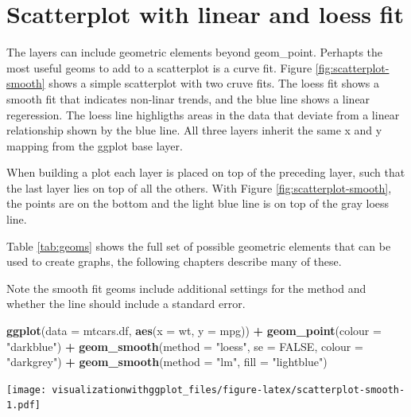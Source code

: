 \documentclass[]{krantz}
\makeatletter
\newenvironment{Shaded}{\begin{snugshade}}{\end{snugshade}}
\newcommand{\KeywordTok}[1]{\textcolor[rgb]{0.13,0.29,0.53}{\textbf{#1}}}
\newcommand{\DataTypeTok}[1]{\textcolor[rgb]{0.13,0.29,0.53}{#1}}
\newcommand{\StringTok}[1]{\textcolor[rgb]{0.31,0.60,0.02}{#1}}
\newcommand{\OtherTok}[1]{\textcolor[rgb]{0.56,0.35,0.01}{#1}}
\newcommand{\OperatorTok}[1]{\textcolor[rgb]{0.81,0.36,0.00}{\textbf{#1}}}
\newcommand{\NormalTok}[1]{#1}
\newenvironment{kframe}{%
\medskip{}
\setlength{\fboxsep}{.8em}
 \def\at@end@of@kframe{}%
 \ifinner\ifhmode%
  \def\at@end@of@kframe{\end{minipage}}%
  \begin{minipage}{\columnwidth}%
 \fi\fi%
 \def\FrameCommand##1{\hskip\@totalleftmargin \hskip-\fboxsep
 \colorbox{shadecolor}{##1}\hskip-\fboxsep
     \hskip-\linewidth \hskip-\@totalleftmargin \hskip\columnwidth}%
 \MakeFramed {\advance\hsize-\width
   \@totalleftmargin\z@ \linewidth\hsize
   \@setminipage}}%
 {\par\unskip\endMakeFramed%
 \at@end@of@kframe}
\renewenvironment{Shaded}{\begin{kframe}}{\end{kframe}}
\theoremstyle{definition}
\theoremstyle{definition}
\theoremstyle{definition}
\theoremstyle{remark}
\makeatother
\begin{document}
\section{Scatterplot with linear and loess
fit}\label{scatterplot-with-linear-and-loess-fit}

The layers can include geometric elements beyond geom\_point. Perhapts
the most useful geoms to add to a scatterplot is a curve fit. Figure
\ref{fig:scatterplot-smooth} shows a simple scatterplot with two cruve
fits. The loess fit shows a smooth fit that indicates non-linar trends,
and the blue line shows a linear regeression. The loess line highligths
areas in the data that deviate from a linear relationship shown by the
blue line. All three layers inherit the same x and y mapping from the
ggplot base layer.

When building a plot each layer is placed on top of the preceding layer,
such that the last layer lies on top of all the others. With Figure
\ref{fig:scatterplot-smooth}, the points are on the bottom and the light
blue line is on top of the gray loess line.

Table \ref{tab:geoms} shows the full set of possible geometric elements
that can be used to create graphs, the following chapters describe many
of these.

Note the smooth fit geoms include additional settings for the method and
whether the line should include a standard error.

\begin{Shaded}
\begin{Highlighting}[]
\KeywordTok{ggplot}\NormalTok{(}\DataTypeTok{data =}\NormalTok{ mtcars.df, }\KeywordTok{aes}\NormalTok{(}\DataTypeTok{x =}\NormalTok{ wt, }\DataTypeTok{y =}\NormalTok{ mpg)) }\OperatorTok{+}
\StringTok{  }\KeywordTok{geom_point}\NormalTok{(}\DataTypeTok{colour =} \StringTok{"darkblue"}\NormalTok{) }\OperatorTok{+}
\StringTok{  }\KeywordTok{geom_smooth}\NormalTok{(}\DataTypeTok{method =} \StringTok{"loess"}\NormalTok{, }\DataTypeTok{se =} \OtherTok{FALSE}\NormalTok{, }\DataTypeTok{colour =} \StringTok{"darkgrey"}\NormalTok{) }\OperatorTok{+}\StringTok{ }
\StringTok{  }\KeywordTok{geom_smooth}\NormalTok{(}\DataTypeTok{method =} \StringTok{"lm"}\NormalTok{, }\DataTypeTok{fill =} \StringTok{"lightblue"}\NormalTok{)}
\end{Highlighting}
\end{Shaded}

\texttt{[image: visualizationwithggplot\_files/figure-latex/scatterplot-smooth-1.pdf]}
\end{document}
